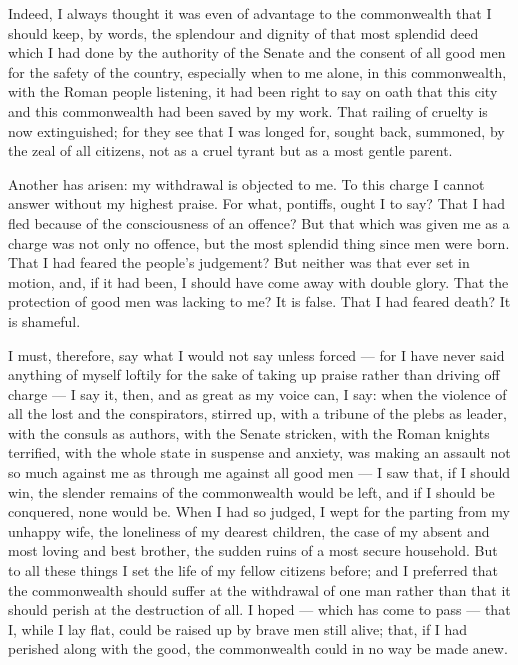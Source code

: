  Indeed, I always thought it was even of advantage to the commonwealth that I should keep, by words, the splendour and dignity of that most splendid deed which I had done by the authority of the Senate and the consent of all good men for the safety of the country, especially when to me alone, in this commonwealth, with the Roman people listening, it had been right to say on oath that this city and this commonwealth had been saved by my work. That railing of cruelty is now extinguished; for they see that I was longed for, sought back, summoned, by the zeal of all citizens, not as a cruel tyrant but as a most gentle parent.

 Another has arisen: my withdrawal is objected to me. To this charge I cannot answer without my highest praise. For what, pontiffs, ought I to say? That I had fled because of the consciousness of an offence? But that which was given me as a charge was not only no offence, but the most splendid thing since men were born. That I had feared the people's judgement? But neither was that ever set in motion, and, if it had been, I should have come away with double glory. That the protection of good men was lacking to me? It is false. That I had feared death? It is shameful.

 I must, therefore, say what I would not say unless forced --- for I have never said anything of myself loftily for the sake of taking up praise rather than driving off charge --- I say it, then, and as great as my voice can, I say: when the violence of all the lost and the conspirators, stirred up, with a tribune of the plebs as leader, with the consuls as authors, with the Senate stricken, with the Roman knights terrified, with the whole state in suspense and anxiety, was making an assault not so much against me as through me against all good men --- I saw that, if I should win, the slender remains of the commonwealth would be left, and if I should be conquered, none would be. When I had so judged, I wept for the parting from my unhappy wife, the loneliness of my dearest children, the case of my absent and most loving and best brother, the sudden ruins of a most secure household. But to all these things I set the life of my fellow citizens before; and I preferred that the commonwealth should suffer at the withdrawal of one man rather than that it should perish at the destruction of all. I hoped --- which has come to pass --- that I, while I lay flat, could be raised up by brave men still alive; that, if I had perished along with the good, the commonwealth could in no way be made anew.

